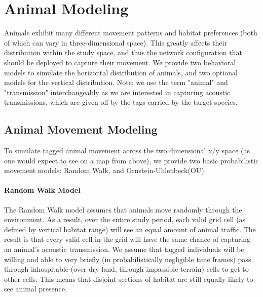 \section{Animal Modeling}
\label{animalModeling}
Animals exhibit many different movement patterns and habitat preferences (both of which can vary in three-dimensional space).  This greatly affects their distribution within the study space, and thus the network configuration that should be deployed to capture their movement.  We provide two behavioral models to simulate the horizontal distribution of animals, and two optional models for the vertical distribution.  Note: we use the term "animal" and "transmission" interchangeably as we are interested in capturing acoustic transmissions, which are given off by the tags carried by the target species.


\subsection{Animal Movement Modeling}
\label{animalMovementModel}
To simulate tagged animal movement across the two dimensional x/y space (as one would expect to see on a map from above), we provide two basic probabilistic movement models: Random Walk, and Ornstein-Uhlenbeck(OU).  

\paragraph{Random Walk Model}
\label{randomWalkModel}
The Random Walk model assumes that animals move randomly through the environment.  As a result, over the entire study period, each valid grid cell (as defined by vertical habitat range) will see an equal amount of animal traffic.  The result is that every valid cell  in the grid will have the same chance of capturing an animal's acoustic transmission.  We assume that tagged individuals will be willing and able to very briefly (in probabilistically negligible time frames) pass through inhospitable (over dry land, through impassible terrain) cells to get to other cells.  This means that disjoint sections of habitat are still equally likely to see animal presence.


